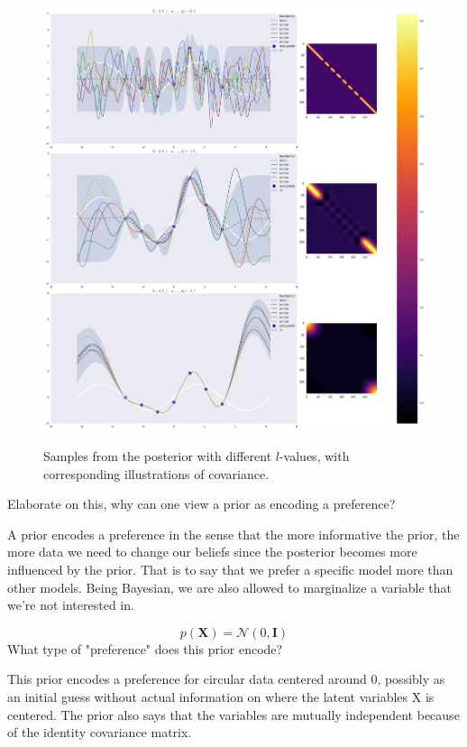 \documentclass[12pt]{article}
\newenvironment{question}[2][Question]{\begin{trivlist}
\kern10pt
\item[\hskip \labelsep {\bfseries #1}\hskip \labelsep {\bfseries #2.}]}{\end{trivlist}}
\newcommand*{\answer}{%
  \par
  \kern1pt
  \begingroup
    \centering
    \raisebox{.2\baselineskip}{%
      \textcolor{gray}{
	    \rule{.6667\linewidth}{.1pt}%
      }
    }%
    \par
  \kern8pt
  \endgroup
}
\begin{document}
\begin{question}{14}
\begin{figure}
\caption{Samples from the posterior with different $l$-values, with corresponding illustrations of covariance.}
\includegraphics[scale=0.4]{gp}
\centering
\label{gp}
\end{figure}

\end{question}

\begin{question}{15}
Elaborate on this, why can one view a prior as encoding a preference?

\answer

A prior encodes a preference in the sense that the more informative the prior, the more data we need to change our beliefs since the posterior becomes more influenced by the prior. That is to say that we prefer a specific model more than other models. Being Bayesian, we are also allowed to marginalize a variable that we're not interested in.
\end{question}

\begin{question}{16}
$$p(\boldsymbol{X}) = \mathcal{N}(0, \boldsymbol{I})$$
What type of "preference" does this prior encode?

\answer

This prior encodes a preference for circular data centered around 0, possibly as an initial guess without actual information on where the latent variables X is centered. The prior also says that the variables are mutually independent because of the identity covariance matrix. 
\end{question}
\end{document}
